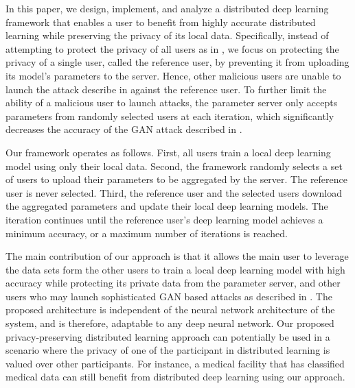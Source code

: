 \documentclass[letterpaper]{article}
\begin{document}
\begin{flushleft}
{In this paper, we design, implement, and analyze a distributed deep learning framework that enables a user 
to benefit from highly accurate distributed learning while preserving the privacy of its local data. 
Specifically,  instead of attempting to protect the privacy of all users as in \cite{shokri2015privacy}, we focus on protecting the
privacy of a single user, called the reference user, by preventing it from uploading its model's parameters to the server. Hence,
other malicious users are unable to launch the attack describe in \cite{hitaj2017deep} against the reference user. To further limit the
ability of a malicious user to launch attacks, the parameter server only accepts parameters from randomly
selected users at each iteration, which significantly decreases the accuracy of the GAN attack described in \cite{hitaj2017deep}. 

Our framework operates as follows. First, all users train a local deep learning model using only their local data.
Second, the framework randomly selects a set of users to upload their parameters to be aggregated by the server. The reference user is
never selected. Third, the reference user and the selected users download the aggregated parameters and update their local
deep learning models. The iteration continues until the reference user's deep learning model achieves a minimum
accuracy, or a maximum number of iterations is reached.

The main contribution of our approach is that it allows the main user to leverage the data sets form the other users to train a local
deep learning model with high accuracy while protecting its private data from the parameter server, and other users who
may launch sophisticated GAN based attacks as described in \cite{hitaj2017deep}. The proposed architecture is independent of the
neural network architecture of the system, and is therefore, adaptable to any deep neural network. Our proposed privacy-preserving
distributed learning approach can potentially be used in a scenario where the privacy of one of the participant in distributed learning is valued over other participants. For instance, a medical facility that has classified medical data can still benefit from distributed deep learning using our approach. 


}
\end{flushleft}
\end{document}
